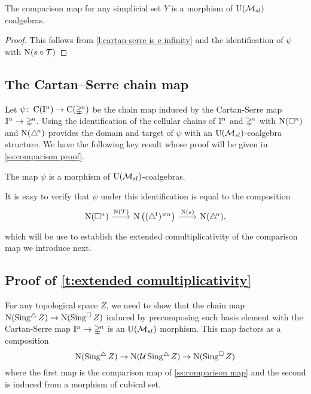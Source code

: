 \begin{theorem} \label{t:comparison map is e infinity}
	The comparison map for any simplicial set $Y$ is a morphism of ${\operatorname{U}(\mathcal{M}_{sl})}$ coalgebras.
\end{theorem}

\begin{proof}
	This follows from \cref{l:cartan-serre is e infinity} and the identification of $\psi$ with $\operatorname{N}(s \circ \mathcal T)$
\end{proof}

\subsection{The Cartan--Serre chain map} \label{ss:the cartan-serre chain map}

Let $\psi \colon \operatorname{C}(\mathbb{I}^n) \to \operatorname{C}(\mathbb{\Delta}^{\!n})$ be the chain map induced by the Cartan-Serre map $\mathbb{I}^n \to \mathbb{\Delta}^{\!n}$.
Using the identification of the cellular chains of $\mathbb{I}^n$ and $\mathbb{\Delta}^{\!n}$ with $\operatorname{N}(\square^n)$ and $\operatorname{N}(\triangle^{\!n})$
provides the domain and target of $\psi$ with an ${\operatorname{U}(\mathcal{M}_{sl})}$-coalgebra structure.
We have the following key result whose proof will be given in  \cref{ss:comparison proof}.

\begin{lemma} \label{l:cartan-serre is e infinity}
	The map $\psi$ is a morphism of ${\operatorname{U}(\mathcal{M}_{sl})}$-coalgebras.
\end{lemma}

It is easy to verify that $\psi$ under this identification is equal to the composition
\[
\begin{tikzcd}[column sep=normal]
\chains(\cube^n) \arrow[r, "\chains(\triangulate)"] &[-3pt]
\chains \big( \scube{n} \big) \arrow[r, "\chains(s)"] &[-3pt]
\chains(\simplex^{\!n}),
\end{tikzcd}
\]
which will be use to establish the extended comultiplicativity of the comparison map we introduce next.

\subsection{Proof of \cref{t:extended comultiplicativity}} \label{ss:proof extended comultiplicativity}

For any topological space $Z$, we need to show that the chain map $\operatorname{N}(\operatorname{Sing^{\triangle}} Z) \to \operatorname{N}(\operatorname{Sing^{\square}} Z)$ induced by precomposing each basis element with the Cartan-Serre map $\mathbb{I}^n \to \mathbb{\Delta}^{\!n}$ is an ${\operatorname{U}(\mathcal{M}_{sl})}$ morphism.
This map factors as a composition
\[
\operatorname{N}(\operatorname{Sing^{\triangle}} Z) \to \operatorname{N}(\operatorname{\mathcal{U}} \operatorname{Sing^{\triangle}} Z) \to \operatorname{N}(\operatorname{Sing^{\square}} Z)
\]
where the first map is the comparison map of \cref{ss:comparison map} and the second is induced from a morphism of cubical set.

